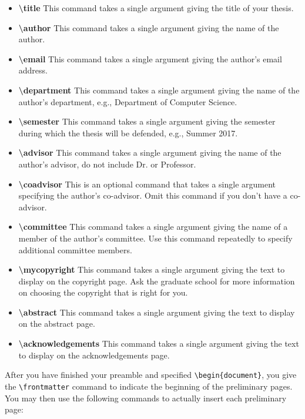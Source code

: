 \documentclass[master]{thesis}
\begin{document}
\begin{itemize}
    \item \textbf{\textbackslash title}  This command takes a single argument giving the title of your thesis.
    \item \textbf{\textbackslash author}  This command takes a single argument giving the name of the author.
    \item \textbf{\textbackslash email}  This command takes a single argument giving the author's email address.
    \item \textbf{\textbackslash department}  This command takes a single argument giving the name of the author's department, e.g., Department of Computer Science.
    \item \textbf{\textbackslash semester}  This command takes a single argument giving the semester during which the thesis will be defended, e.g., Summer 2017.
    \item \textbf{\textbackslash advisor}  This command takes a single argument giving the name of the author's advisor, do not include Dr. or Professor.
    \item \textbf{\textbackslash coadvisor}  This is an optional command that takes a single argument specifying the author's co-advisor.  Omit this command if you don't have a co-advisor.
    \item \textbf{\textbackslash committee}  This command takes a single argument giving the name of a member of the author's committee.  Use this command repeatedly to specify additional committee members.
    \item \textbf{\textbackslash mycopyright}  This command takes a single argument giving the text to display on the copyright page.  Ask the graduate school for more information on choosing the copyright that is right for you.
    \item \textbf{\textbackslash abstract}  This command takes a single argument giving the text to display on the abstract page.
    \item \textbf{\textbackslash acknowledgements}  This command takes a single argument giving the text to display on the acknowledgements page.
\end{itemize}

After you have finished your preamble and specified \verb|\begin{document}|, you give the \verb|\frontmatter| command to indicate the beginning of the preliminary pages.  You may then use the following commands to actually insert each preliminary page:
\end{document}

